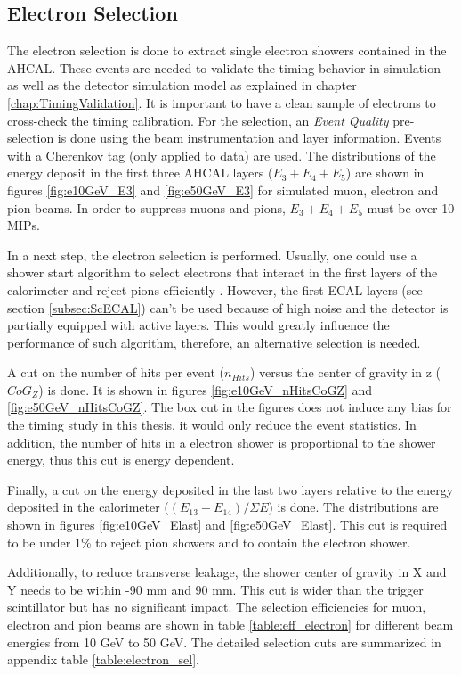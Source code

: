 \subsection{Electron Selection}
\label{subsec:elec_sel}

The electron selection is done to extract single electron showers contained in the AHCAL. These events are needed to validate the timing behavior in simulation as well as the detector simulation model as explained in chapter \ref{chap:TimingValidation}. It is important to have a clean sample of electrons to cross-check the timing calibration. For the selection, an \textit{Event Quality} pre-selection is done using the beam instrumentation and layer information. Events with a Cherenkov tag (only applied to data) are used. The distributions of the energy deposit in the first three AHCAL layers ($E_3+E_4+E_5$) are shown in figures \ref{fig:e10GeV_E3} and \ref{fig:e50GeV_E3} for simulated muon, electron and pion beams. In order to suppress muons and pions, $E_3+E_4+E_5$ must be over 10 MIPs.

In a next step, the electron selection is performed. Usually, one could use a shower start algorithm to select electrons that interact in the first layers of the calorimeter and reject pions efficiently \cite{Hartbrich:2016bbz}. However, the first ECAL layers (see section \ref{subsec:ScECAL}) can't be used because of high noise and the detector is partially equipped with active layers. This would greatly influence the performance of such algorithm, therefore, an alternative selection is needed.

A cut on the number of hits per event ($n_{Hits}$) versus the center of gravity in z ($CoG_Z$) is done. It is shown in figures \ref{fig:e10GeV_nHitsCoGZ} and \ref{fig:e50GeV_nHitsCoGZ}. The box cut in the figures does not induce any bias for the timing study in this thesis, it would only reduce the event statistics. In addition, the number of hits in a electron shower is proportional to the shower energy, thus this cut is energy dependent.

Finally, a cut on the energy deposited in the last two layers relative to the energy deposited in the calorimeter ($(E_{13}+E_{14})/\Sigma E$) is done. The distributions are shown in figures \ref{fig:e10GeV_Elast} and \ref{fig:e50GeV_Elast}. This cut is required to be under 1\% to reject pion showers and to contain the electron shower.

Additionally, to reduce transverse leakage, the shower center of gravity in X and Y needs to be within -90 mm and 90 mm. This cut is wider than the trigger scintillator but has no significant impact. The selection efficiencies for muon, electron and pion beams are shown in table \ref{table:eff_electron} for different beam energies from 10 GeV to 50 GeV. The detailed selection cuts are summarized in appendix table \ref{table:electron_sel}.

